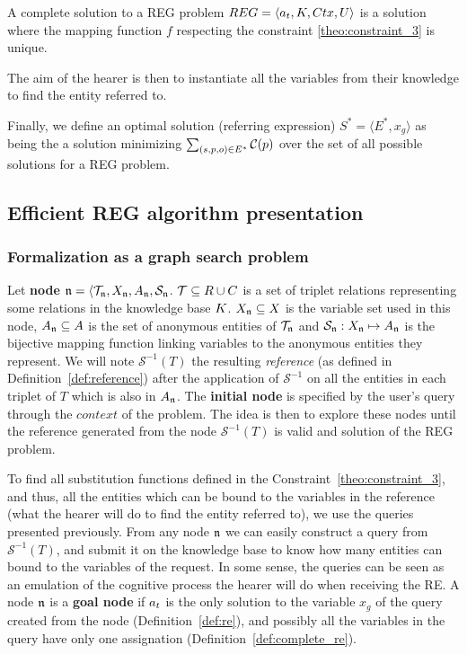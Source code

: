 \documentclass[a4paper,11pt,twoside]{StyleThese}
\begin{document}
\begin{definition}
\label{def:complete_re}
A complete solution to a REG problem $REG = \langle a_t, K, Ctx, U \rangle$ is a solution where the mapping function $f$ respecting the constraint \ref{theo:constraint_3} is unique.
\end{definition}

The aim of the hearer is then to instantiate all the variables from their knowledge to find the entity referred to.

Finally, we define an optimal solution (referring expression) $S^* = \langle E^*, x_g \rangle$ as being the a solution minimizing $\sum_{(s, p, o) \in E^*}\mathcal{C}(p)$ over the set of all possible solutions for a REG problem.


\subsection{Efficient REG algorithm presentation}
\subsubsection{Formalization as a graph search problem}
\label{sec:SCFormalisation}

Let \textbf{node} $\mathfrak{n} = \langle \mathcal{T}_{\mathfrak{n}}, X_{\mathfrak{n}}, A_{\mathfrak{n}}, \mathcal{S}_{\mathfrak{n}}$. $\mathcal{T} \subseteq R \cup C$ is a set of triplet relations representing some relations in the knowledge base $K$. $X_{\mathfrak{n}} \subseteq X$ is the variable set used in this node, $A_{\mathfrak{n}} \subseteq A$ is the set of anonymous entities of $\mathcal{T}_{\mathfrak{n}}$ and $\mathcal{S}_{\mathfrak{n}}: X_{\mathfrak{n}} \mapsto A_{\mathfrak{n}}$ is the bijective mapping function linking variables to the anonymous entities they represent. We will note $\mathcal{S}^{-1}(T)$ the resulting \textit{reference} (as defined in Definition~\ref{def:reference}) after the application of $\mathcal{S}^{-1}$ on all the entities in each triplet of $T$ which is also in $A_{\mathfrak{n}}$.
The \textbf{initial node} is specified by the user's query through the $context$ of the problem.
The idea is then to explore these nodes until the reference generated from the node $\mathcal{S}^{-1}(T)$ is valid and solution of the REG problem.
 
To find all substitution functions defined in the Constraint~\ref{theo:constraint_3}, and thus, all the entities which can be bound to the variables in the reference (what the hearer will do to find the entity referred to), we use the \sparql{} queries presented previously. From any node $\mathfrak{n}$ we can easily construct a \sparql{} query from $\mathcal{S}^{-1}(T)$, and submit it on the knowledge base to know how many entities can bound to the variables of the request. In some sense, the \sparql{} queries can be seen as an emulation of the cognitive process the hearer will do when receiving the RE.
A node $\mathfrak{n}$ is a \textbf{goal node} if $a_t$ is the only solution to the variable $x_g$ of the \sparql{} query created from the node (Definition~\ref{def:re}), and possibly all the variables in the \sparql{} query have only one assignation (Definition~\ref{def:complete_re}).
\end{document}
